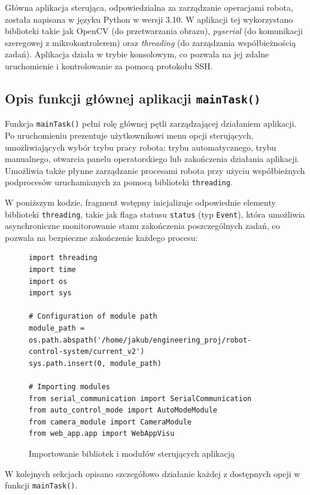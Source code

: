 Główna aplikacja sterująca, odpowiedzialna za zarządzanie operacjami robota, została napisana w języku Python w wersji 3.10. W aplikacji tej wykorzystano biblioteki takie jak OpenCV (do przetwarzania obrazu), \textit{pyserial} (do komunikacji szeregowej z mikrokontrolerem) oraz \textit{threading} (do zarządzania współbieżnością zadań). Aplikacja działa w trybie konsolowym, co pozwala na jej zdalne uruchomienie i kontrolowanie za pomocą protokołu SSH.


\subsection{Opis funkcji głównej aplikacji \texttt{mainTask()}}

Funkcja \texttt{mainTask()} pełni rolę głównej pętli zarządzającej działaniem aplikacji. Po uruchomieniu prezentuje użytkownikowi menu opcji sterujących, umożliwiających wybór trybu pracy robota: trybu automatycznego, trybu manualnego, otwarcia panelu operatorskiego lub zakończenia działania aplikacji. Umożliwia także płynne zarządzanie procesami robota przy użyciu współbieżnych podprocesów uruchamianych za pomocą biblioteki \texttt{threading}.

W poniższym kodzie, fragment wstępny inicjalizuje odpowiednie elementy biblioteki \texttt{threading}, takie jak flaga statusu \texttt{status} (typ \texttt{Event}), która umożliwia asynchroniczne monitorowanie stanu zakończenia poszczególnych zadań, co pozwala na bezpieczne zakończenie każdego procesu:

\begin{figure}[h!]
  \centering
  \begin{lstlisting}
import threading
import time
import os
import sys

# Configuration of module path
module_path = os.path.abspath('/home/jakub/engineering_proj/robot-control-system/current_v2')
sys.path.insert(0, module_path)

# Importing modules
from serial_communication import SerialCommunication
from auto_control_mode import AutoModeModule
from camera_module import CameraModule
from web_app.app import WebAppVisu
  \end{lstlisting}
  \caption{Importowanie bibliotek i modułów sterujących aplikacją}
  \label{fig:imported_modules}
\end{figure}

W kolejnych sekcjach opisano szczegółowo działanie każdej z dostępnych opcji w funkcji \texttt{mainTask()}.

